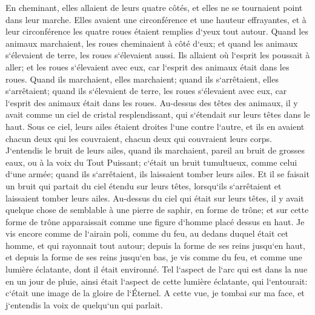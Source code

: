 \verse En cheminant, elles allaient de leurs quatre côtés, et elles ne se tournaient point dans leur marche. 
\verse Elles avaient une circonférence et une hauteur effrayantes, et à leur circonférence les quatre roues étaient remplies d`yeux tout autour. 
\verse Quand les animaux marchaient, les roues cheminaient à côté d`eux; et quand les animaux s`élevaient de terre, les roues s`élevaient aussi. 
\verse Ils allaient où l`esprit les poussait à aller; et les roues s`élevaient avec eux, car l`esprit des animaux était dans les roues. 
\verse Quand ils marchaient, elles marchaient; quand ils s`arrêtaient, elles s`arrêtaient; quand ils s`élevaient de terre, les roues s`élevaient avec eux, car l`esprit des animaux était dans les roues. 
\verse Au-dessus des têtes des animaux, il y avait comme un ciel de cristal resplendissant, qui s`étendait sur leurs têtes dans le haut. 
\verse Sous ce ciel, leurs ailes étaient droites l`une contre l`autre, et ils en avaient chacun deux qui les couvraient, chacun deux qui couvraient leurs corps. 
\verse J`entendis le bruit de leurs ailes, quand ils marchaient, pareil au bruit de grosses eaux, ou à la voix du Tout Puissant; c`était un bruit tumultueux, comme celui d`une armée; quand ils s`arrêtaient, ils laissaient tomber leurs ailes. 
\verse Et il se faisait un bruit qui partait du ciel étendu sur leurs têtes, lorsqu`ils s`arrêtaient et laissaient tomber leurs ailes. 
\verse Au-dessus du ciel qui était sur leurs têtes, il y avait quelque chose de semblable à une pierre de saphir, en forme de trône; et sur cette forme de trône apparaissait comme une figure d`homme placé dessus en haut. 
\verse Je vis encore comme de l`airain poli, comme du feu, au dedans duquel était cet homme, et qui rayonnait tout autour; depuis la forme de ses reins jusqu`en haut, et depuis la forme de ses reins jusqu`en bas, je vis comme du feu, et comme une lumière éclatante, dont il était environné. 
\verse Tel l`aspect de l`arc qui est dans la nue en un jour de pluie, ainsi était l`aspect de cette lumière éclatante, qui l`entourait: c`était une image de la gloire de l`Éternel. A cette vue, je tombai sur ma face, et j`entendis la voix de quelqu`un qui parlait. 

\chapter{}


